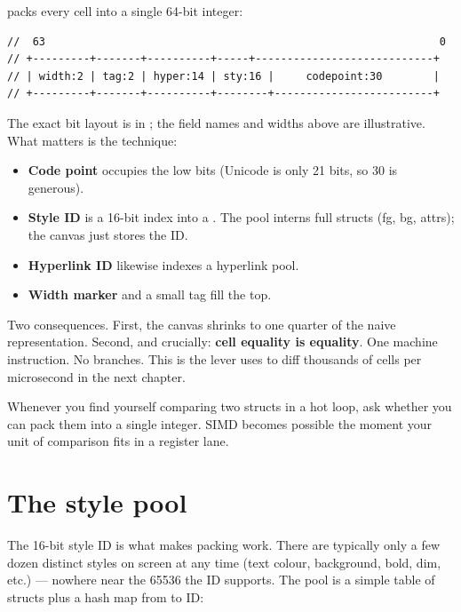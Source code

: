 \maya{} packs every cell into a single 64-bit integer:

\begin{lstlisting}
//  63                                                              0
// +---------+-------+----------+-----+----------------------------+
// | width:2 | tag:2 | hyper:14 | sty:16 |     codepoint:30        |
// +---------+-------+----------+--------+-------------------------+
\end{lstlisting}

The exact bit layout is in ;
the field names and widths above are illustrative. What matters is
the technique:

\begin{itemize}[leftmargin=*]
  \item \textbf{Code point} occupies the low bits (Unicode is only
    21 bits, so 30 is generous).
  \item \textbf{Style ID} is a 16-bit index into a .
    The pool interns full  structs (fg, bg, attrs); the
    canvas just stores the ID.
  \item \textbf{Hyperlink ID} likewise indexes a hyperlink pool.
  \item \textbf{Width marker} and a small tag fill the top.
\end{itemize}

Two consequences. First, the canvas shrinks to one quarter of the
naive representation. Second, and crucially: \textbf{cell equality is
 equality}. One machine instruction. No branches. This
is the lever \maya{} uses to diff thousands of cells per microsecond
in the next chapter.

\begin{idea}
Whenever you find yourself comparing two structs in a hot loop, ask
whether you can pack them into a single integer. SIMD becomes
possible the moment your unit of comparison fits in a register lane.
\end{idea}

\section{The style pool}

The 16-bit style ID is what makes packing work. There are typically
only a few dozen distinct styles on screen at any time (text colour,
background, bold, dim, etc.) --- nowhere near the 65536 the ID
supports. The pool is a simple table of  structs plus a
hash map from  to ID:

